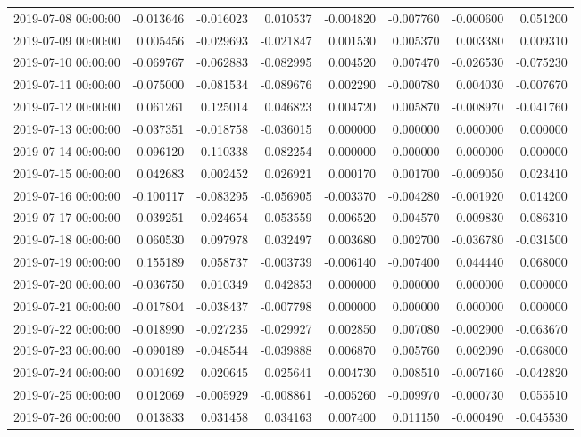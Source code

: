 \begin{tabular}{lrrrrrrr}
2019-07-08 00:00:00 & -0.013646 & -0.016023 & 0.010537 & -0.004820 & -0.007760 & -0.000600 & 0.051200 \\
2019-07-09 00:00:00 & 0.005456 & -0.029693 & -0.021847 & 0.001530 & 0.005370 & 0.003380 & 0.009310 \\
2019-07-10 00:00:00 & -0.069767 & -0.062883 & -0.082995 & 0.004520 & 0.007470 & -0.026530 & -0.075230 \\
2019-07-11 00:00:00 & -0.075000 & -0.081534 & -0.089676 & 0.002290 & -0.000780 & 0.004030 & -0.007670 \\
2019-07-12 00:00:00 & 0.061261 & 0.125014 & 0.046823 & 0.004720 & 0.005870 & -0.008970 & -0.041760 \\
2019-07-13 00:00:00 & -0.037351 & -0.018758 & -0.036015 & 0.000000 & 0.000000 & 0.000000 & 0.000000 \\
2019-07-14 00:00:00 & -0.096120 & -0.110338 & -0.082254 & 0.000000 & 0.000000 & 0.000000 & 0.000000 \\
2019-07-15 00:00:00 & 0.042683 & 0.002452 & 0.026921 & 0.000170 & 0.001700 & -0.009050 & 0.023410 \\
2019-07-16 00:00:00 & -0.100117 & -0.083295 & -0.056905 & -0.003370 & -0.004280 & -0.001920 & 0.014200 \\
2019-07-17 00:00:00 & 0.039251 & 0.024654 & 0.053559 & -0.006520 & -0.004570 & -0.009830 & 0.086310 \\
2019-07-18 00:00:00 & 0.060530 & 0.097978 & 0.032497 & 0.003680 & 0.002700 & -0.036780 & -0.031500 \\
2019-07-19 00:00:00 & 0.155189 & 0.058737 & -0.003739 & -0.006140 & -0.007400 & 0.044440 & 0.068000 \\
2019-07-20 00:00:00 & -0.036750 & 0.010349 & 0.042853 & 0.000000 & 0.000000 & 0.000000 & 0.000000 \\
2019-07-21 00:00:00 & -0.017804 & -0.038437 & -0.007798 & 0.000000 & 0.000000 & 0.000000 & 0.000000 \\
2019-07-22 00:00:00 & -0.018990 & -0.027235 & -0.029927 & 0.002850 & 0.007080 & -0.002900 & -0.063670 \\
2019-07-23 00:00:00 & -0.090189 & -0.048544 & -0.039888 & 0.006870 & 0.005760 & 0.002090 & -0.068000 \\
2019-07-24 00:00:00 & 0.001692 & 0.020645 & 0.025641 & 0.004730 & 0.008510 & -0.007160 & -0.042820 \\
2019-07-25 00:00:00 & 0.012069 & -0.005929 & -0.008861 & -0.005260 & -0.009970 & -0.000730 & 0.055510 \\
2019-07-26 00:00:00 & 0.013833 & 0.031458 & 0.034163 & 0.007400 & 0.011150 & -0.000490 & -0.045530 \\

\end{tabular}
